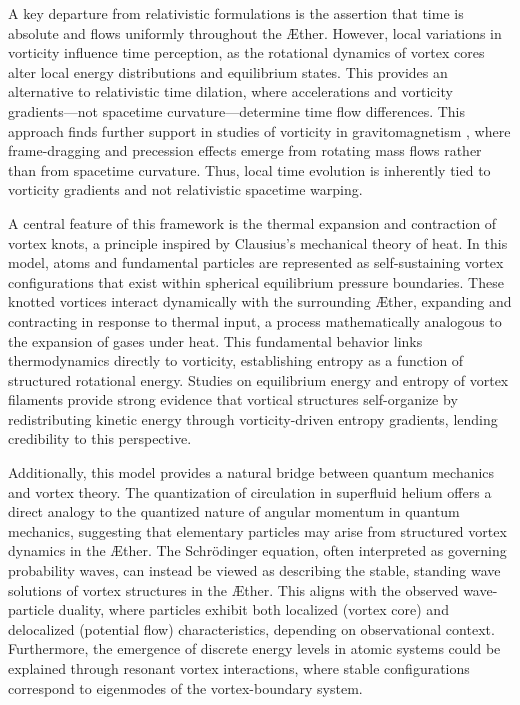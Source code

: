 \documentclass[a4paper,10pt]{article}
\begin{document}
    A key departure from relativistic formulations is the assertion that time is absolute and flows uniformly throughout the Æther. However, local variations in vorticity influence time perception, as the rotational dynamics of vortex cores alter local energy distributions and equilibrium states. This provides an alternative to relativistic time dilation, where accelerations and vorticity gradients—not spacetime curvature—determine time flow differences. This approach finds further support in studies of vorticity in gravitomagnetism \cite{cahill2005}, where frame-dragging and precession effects emerge from rotating mass flows rather than from spacetime curvature. Thus, local time evolution is inherently tied to vorticity gradients and not relativistic spacetime warping.

    A central feature of this framework is the thermal expansion and contraction of vortex knots, a principle inspired by Clausius’s mechanical theory of heat. In this model, atoms and fundamental particles are represented as self-sustaining vortex configurations that exist within spherical equilibrium pressure boundaries. These knotted vortices interact dynamically with the surrounding Æther, expanding and contracting in response to thermal input, a process mathematically analogous to the expansion of gases under heat. This fundamental behavior links thermodynamics directly to vorticity, establishing entropy as a function of structured rotational energy. Studies on equilibrium energy and entropy of vortex filaments \cite{belik2023} provide strong evidence that vortical structures self-organize by redistributing kinetic energy through vorticity-driven entropy gradients, lending credibility to this perspective.

    Additionally, this model provides a natural bridge between quantum mechanics and vortex theory. The quantization of circulation in superfluid helium offers a direct analogy to the quantized nature of angular momentum in quantum mechanics, suggesting that elementary particles may arise from structured vortex dynamics in the Æther. The Schrödinger equation, often interpreted as governing probability waves, can instead be viewed as describing the stable, standing wave solutions of vortex structures in the Æther. This aligns with the observed wave-particle duality, where particles exhibit both localized (vortex core) and delocalized (potential flow) characteristics, depending on observational context. Furthermore, the emergence of discrete energy levels in atomic systems could be explained through resonant vortex interactions, where stable configurations correspond to eigenmodes of the vortex-boundary system.
\end{document}
